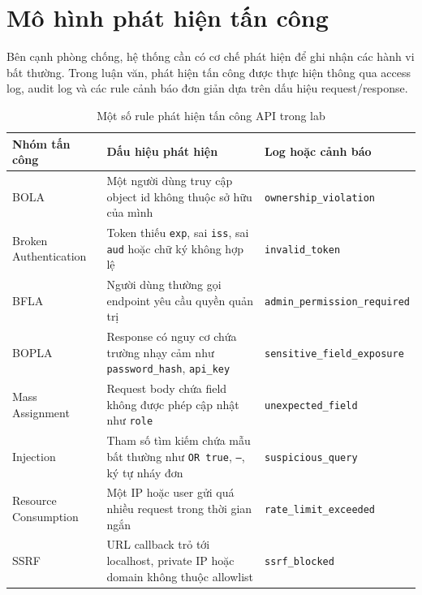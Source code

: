 \documentclass[14pt,a4paper]{extreport}
\begin{document}
\section{Mô hình phát hiện tấn công}
Bên cạnh phòng chống, hệ thống cần có cơ chế phát hiện để ghi nhận các hành vi bất thường. Trong luận văn, phát hiện tấn công được thực hiện thông qua access log, audit log và các rule cảnh báo đơn giản dựa trên dấu hiệu request/response.

\begin{longtable}{p{3.4cm}p{5.4cm}p{5.2cm}}
\caption{Một số rule phát hiện tấn công API trong lab}\\
\toprule
\textbf{Nhóm tấn công} & \textbf{Dấu hiệu phát hiện} & \textbf{Log hoặc cảnh báo}\\
\midrule
BOLA & Một người dùng truy cập object id không thuộc sở hữu của mình & \texttt{ownership\_violation}\\
Broken Authentication & Token thiếu \texttt{exp}, sai \texttt{iss}, sai \texttt{aud} hoặc chữ ký không hợp lệ & \texttt{invalid\_token}\\
BFLA & Người dùng thường gọi endpoint yêu cầu quyền quản trị & \texttt{admin\_permission\_required}\\
BOPLA & Response có nguy cơ chứa trường nhạy cảm như \texttt{password\_hash}, \texttt{api\_key} & \texttt{sensitive\_field\_exposure}\\
Mass Assignment & Request body chứa field không được phép cập nhật như \texttt{role} & \texttt{unexpected\_field}\\
Injection & Tham số tìm kiếm chứa mẫu bất thường như \texttt{OR true}, \texttt{--}, ký tự nháy đơn & \texttt{suspicious\_query}\\
Resource Consumption & Một IP hoặc user gửi quá nhiều request trong thời gian ngắn & \texttt{rate\_limit\_exceeded}\\
SSRF & URL callback trỏ tới localhost, private IP hoặc domain không thuộc allowlist & \texttt{ssrf\_blocked}\\
\bottomrule
\end{longtable}
\end{document}
